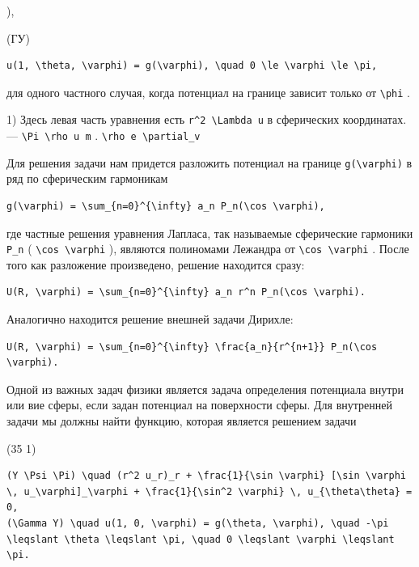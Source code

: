 \documentclass[
  ukrainian,
]{article}
\begin{document}
),

(ГУ)

\begin{verbatim}
u(1, \theta, \varphi) = g(\varphi), \quad 0 \le \varphi \le \pi,
\end{verbatim}

для одного частного случая, когда потенциал на границе зависит только от
\texttt{\textbackslash{}phi} .

1) Здесь левая часть уравнения есть
\texttt{r\^{}2\ \textbackslash{}Lambda\ u} в сферических координатах.---
\texttt{\textbackslash{}Pi\ \textbackslash{}rho\ u\ m} .
\texttt{\textbackslash{}rho\ e\ \textbackslash{}partial\_v}

Для решения задачи нам придется разложить потенциал на границе
\texttt{g(\textbackslash{}varphi)} в ряд по сферическим гармоникам

\begin{verbatim}
g(\varphi) = \sum_{n=0}^{\infty} a_n P_n(\cos \varphi),
\end{verbatim}

где частные решения уравнения Лапласа, так называемые сферические
гармоники \texttt{P\_n} (
\texttt{\textbackslash{}cos\ \textbackslash{}varphi} ), являются
полиномами Лежандра от
\texttt{\textbackslash{}cos\ \textbackslash{}varphi} . После того как
разложение произведено, решение находится сразу:

\begin{verbatim}
U(R, \varphi) = \sum_{n=0}^{\infty} a_n r^n P_n(\cos \varphi).
\end{verbatim}

Аналогично находится решение внешней задачи Дирихле:

\begin{verbatim}
U(R, \varphi) = \sum_{n=0}^{\infty} \frac{a_n}{r^{n+1}} P_n(\cos \varphi).
\end{verbatim}

Одной из важных задач физики является задача определения потенциала
внутри или вие сферы, если задан потенциал на поверхности сферы. Для
внутренней задачи мы должны найти функцию, которая является решением
задачи

(35 1)

\begin{verbatim}
(Y \Psi \Pi) \quad (r^2 u_r)_r + \frac{1}{\sin \varphi} [\sin \varphi \, u_\varphi]_\varphi + \frac{1}{\sin^2 \varphi} \, u_{\theta\theta} = 0,
(\Gamma Y) \quad u(1, 0, \varphi) = g(\theta, \varphi), \quad -\pi \leqslant \theta \leqslant \pi, \quad 0 \leqslant \varphi \leqslant \pi.
\end{verbatim}
\end{document}
